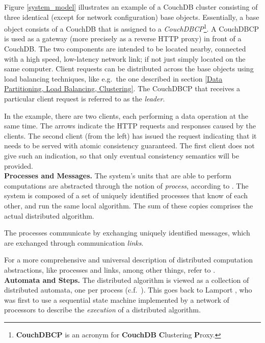 Figure \ref{system_model} illustrates an example of a CouchDB cluster consisting of three identical (except for network configuration) base objects. Essentially, a base object consists of a CouchDB that is assigned to a \emph{CouchDBCP}\footnote{{\bf CouchDBCP} is an acronym for {\bf CouchDB} {\bf C}lustering {\bf P}roxy.}. A CouchDBCP is used as a gateway (more precisely as a reverse HTTP proxy) in front of a CouchDB. The two components are intended to be located nearby, connected with a high speed, low-latency network link; if not just simply located on the same computer. Client requests can be distributed across the base objects using load balancing techniques, like e.g.\ the one described in section \ref{Data Partitioning, Load Balancing, Clustering}. The CouchDBCP that receives a particular client request is referred to as the \emph{leader}.

In the example, there are two clients, each performing a data operation at the same time. The arrows indicate the HTTP requests and responses caused by the clients. The second client (from the left) has issued the request indicating that it needs to be served with atomic consistency guaranteed. The first client does not give such an indication, so that only eventual consistency semantics will be provided.\\

\noindent
{\bf Processes and Messages.}
The system's units that are able to perform computations are abstracted through the notion of \emph{process}, according to \cite[p.~26]{GR06}. The system is composed of a set of uniquely identified processes that know of each other, and run the same local algorithm. The sum of these copies comprises the actual distributed algorithm.

The processes communicate by exchanging uniquely identified messages, which are exchanged through communication \emph{links}.

For a more comprehensive and universal description of distributed computation abstractions, like processes and links, among other things, refer to \cite{GR06}.\\

\noindent
{\bf Automata and Steps.}
The distributed algorithm is viewed as a collection of distributed automata, one per process (c.f.\ \cite[p.~26ff]{GR06}). This goes back to Lamport \cite{Lam78}, who was first to use a sequential state machine implemented by a network of processors to describe the \emph{execution} of a distributed algorithm.

